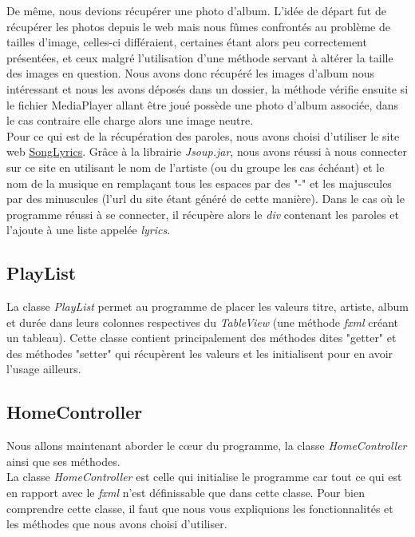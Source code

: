 \documentclass[a4paper,12pt]{report} %
\begin{document}
	De même, nous devions récupérer une photo d'album. L'idée de départ fut de récupérer les photos depuis le web mais nous fûmes confrontés au problème de tailles d'image, celles-ci différaient, certaines étant alors peu correctement présentées, et ceux malgré l'utilisation d'une méthode servant à altérer la taille des images en question. Nous avons donc récupéré les images d’album nous intéressant et nous les avons déposés dans un dossier, la méthode vérifie ensuite si le fichier MediaPlayer allant être joué possède une photo d’album associée, dans le cas contraire elle charge alors une image neutre.\\
	
	
	Pour ce qui est de la récupération des paroles, nous avons choisi d'utiliser le site web \href{http://www.songlyrics.com}{\underline{SongLyrics}}. Grâce à la librairie \textit{Jsoup.jar}, nous avons réussi à nous connecter sur ce site en utilisant le nom de l'artiste (ou du groupe les cas échéant) et le nom de la musique en remplaçant tous les espaces par des "-" et les majuscules par des minuscules (l'url du site étant généré de cette manière). Dans le cas où le programme réussi à se connecter, il récupère alors le \textit{div} contenant les paroles et l'ajoute à une liste appelée \textit{lyrics}.

\subsection{PlayList}

	La classe \textit{PlayList} permet au programme de placer les valeurs titre, artiste, album et durée dans leurs colonnes respectives du \textit{TableView} (une méthode \textit{fxml} créant un tableau). Cette classe contient principalement des méthodes dites "getter" et des méthodes "setter" qui récupèrent les valeurs et les initialisent pour en avoir l'usage ailleurs.
	
\subsection{HomeController}

	Nous allons maintenant aborder le cœur du programme, la classe \textit{HomeController} ainsi que ses méthodes.\\

	La classe \textit{HomeController} est celle qui initialise le programme car tout ce qui est en rapport avec le \textit{fxml} n'est définissable que dans cette classe. Pour bien comprendre cette classe, il faut que nous vous expliquions les fonctionnalités et les méthodes que nous avons choisi d'utiliser. \\
	
\end{document}
